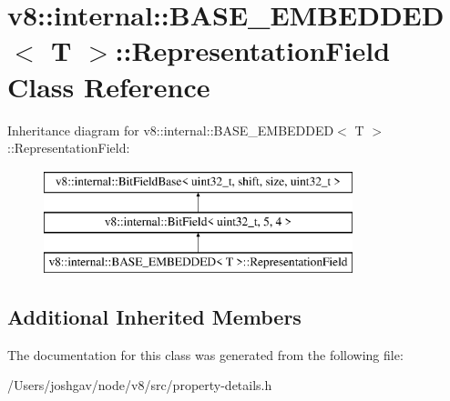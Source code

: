 \hypertarget{classv8_1_1internal_1_1_b_a_s_e___e_m_b_e_d_d_e_d_1_1_representation_field}{}\section{v8\+:\+:internal\+:\+:B\+A\+S\+E\+\_\+\+E\+M\+B\+E\+D\+D\+ED$<$ T $>$\+:\+:Representation\+Field Class Reference}
\label{classv8_1_1internal_1_1_b_a_s_e___e_m_b_e_d_d_e_d_1_1_representation_field}
Inheritance diagram for v8\+:\+:internal\+:\+:B\+A\+S\+E\+\_\+\+E\+M\+B\+E\+D\+D\+ED$<$ T $>$\+:\+:Representation\+Field\+:\begin{figure}[H]
\begin{center}
\leavevmode
\includegraphics[height=3.000000cm]{classv8_1_1internal_1_1_b_a_s_e___e_m_b_e_d_d_e_d_1_1_representation_field}
\end{center}
\end{figure}
\subsection*{Additional Inherited Members}


The documentation for this class was generated from the following file\+:\begin{DoxyCompactItemize}
\item 
/\+Users/joshgav/node/v8/src/property-\/details.\+h\end{DoxyCompactItemize}
